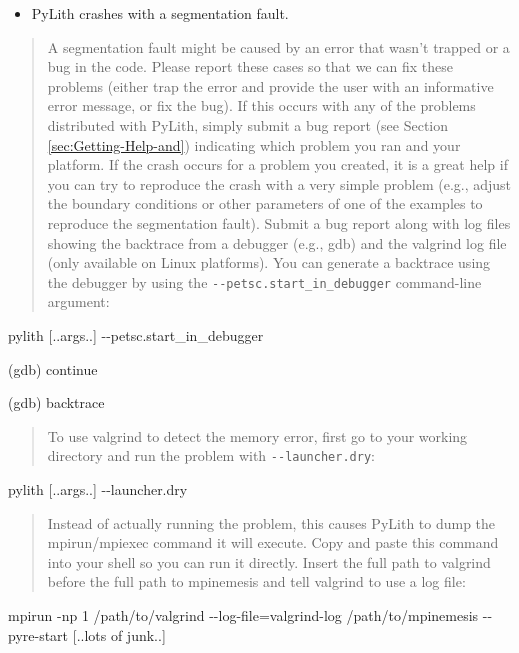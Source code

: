 \begin{itemize}
\item PyLith crashes with a segmentation fault.\end{itemize}
\begin{quote}
A segmentation fault might be caused by an error that wasn't trapped
or a bug in the code. Please report these cases so that we can fix
these problems (either trap the error and provide the user with an
informative error message, or fix the bug). If this occurs with any
of the problems distributed with PyLith, simply submit a bug report
(see Section \vref{sec:Getting-Help-and}) indicating which problem
you ran and your platform. If the crash occurs for a problem you created,
it is a great help if you can try to reproduce the crash with a very
simple problem (e.g., adjust the boundary conditions or other parameters
of one of the examples to reproduce the segmentation fault). Submit
a bug report along with log files showing the backtrace from a debugger
(e.g., gdb) and the valgrind log file (only available on Linux platforms).
You can generate a backtrace using the debugger by using the \texttt{-{}-petsc.start\_in\_debugger}
command-line argument:\end{quote}
\begin{lyxcode}
pylith {[}..args..{]} -{}-petsc.start\_in\_debugger

(gdb) continue

(gdb) backtrace\end{lyxcode}
\begin{quote}
To use valgrind to detect the memory error, first go to your working
directory and run the problem with \texttt{-{}-launcher.dry}:\end{quote}
\begin{lyxcode}
pylith {[}..args..{]} -{}-launcher.dry\end{lyxcode}
\begin{quote}
Instead of actually running the problem, this causes PyLith to dump
the mpirun/mpiexec command it will execute. Copy and paste this command
into your shell so you can run it directly. Insert the full path to
valgrind before the full path to mpinemesis and tell valgrind to use
a log file:\end{quote}
\begin{lyxcode}
{\footnotesize{}mpirun -np 1 /path/to/valgrind -{}-log-file=valgrind-log  /path/to/mpinemesis -{}-pyre-start {[}..lots of junk..{]}}{\footnotesize \par}
\end{lyxcode}

